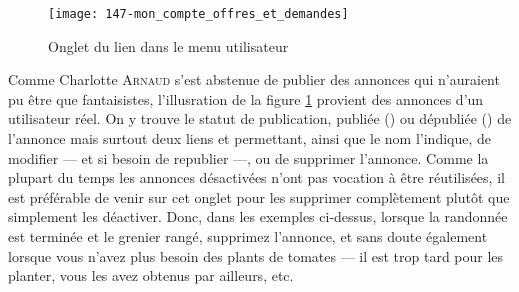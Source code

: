 \begin{figure}
    \texttt{[image: 147-mon\_compte\_offres\_et\_demandes]}
    \caption[Onglet <<~Offres et demandes~>> du lien <<~Mon compte~>> dans le menu utilisateur]{Onglet  du lien  dans le menu utilisateur}
    \label{fig:compte_offres_demandes}
\end{figure}
Comme Charlotte \textsc{Arnaud} s'est abstenue de publier des annonces qui n'auraient pu être que fantaisistes, l'illusration de la figure \ref{fig:compte_offres_demandes} provient des annonces d'un utilisateur réel. On y trouve le statut de publication, publiée () ou dépubliée () de l'annonce mais surtout deux liens  et  permettant, ainsi que le nom l'indique, de modifier --- et si besoin de republier ---, ou de supprimer l'annonce. Comme la plupart du temps les annonces désactivées n'ont pas vocation à être réutilisées, il est préférable de venir sur cet onglet pour les supprimer complètement plutôt que simplement les déactiver. Donc, dans les exemples ci-dessus, lorsque la randonnée est terminée et le grenier rangé, supprimez l'annonce, et sans doute également lorsque vous n'avez plus besoin des plants de tomates  --- il est trop tard pour les planter, vous les avez obtenus par ailleurs, etc.



